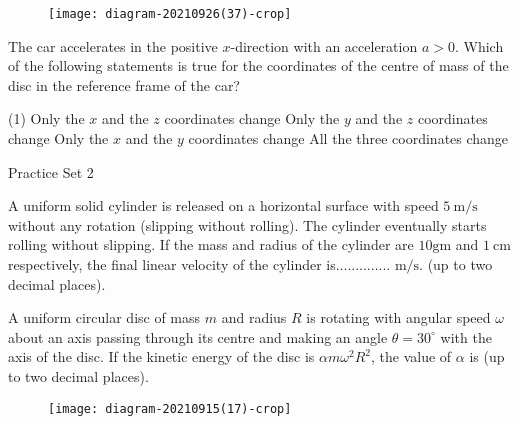 \begin{enumerate}
\begin{minipage}{\textwidth}
	\begin{figure}[H]
		\centering
		\texttt{[image: diagram-20210926(37)-crop]}
	\end{figure}
	The car accelerates in the positive $x$-direction with an acceleration $a>0 .$ Which of the following statements is true for the coordinates of the centre of mass of the disc in the reference frame of the car?
\end{minipage}
\begin{tasks}(1)
	\task[\textbf{A.}]Only the $x$ and the $z$ coordinates change
	\task[\textbf{B.}]Only the $y$ and the $z$ coordinates change
	\task[\textbf{C.}]Only the $x$ and the $y$ coordinates change
	\task[\textbf{D.}]All the three coordinates change
\end{tasks}
\end{enumerate}


\newpage
\begin{abox}
	Practice Set 2
	\end{abox}
\begin{enumerate}
\begin{minipage}{\textwidth}
	\item A uniform solid cylinder is released on a horizontal surface with speed $5 \mathrm{~m} / \mathrm{s}$ without any rotation (slipping without rolling). The cylinder eventually starts rolling without slipping. If the mass and radius of the cylinder are $10 \mathrm{gm}$ and $1 \mathrm{~cm}$ respectively, the final linear velocity of the cylinder is.............. $\mathrm{m} / \mathrm{s}$. (up to two decimal places).
\end{minipage}
\begin{minipage}{\textwidth}
	\item A uniform circular disc of mass $m$ and radius $R$ is rotating with angular speed $\omega$ about an axis passing through its centre and making an angle $\theta=30^{\circ}$ with the axis of the disc. If the kinetic energy of the disc is $\alpha m \omega^{2} R^{2}$, the value of $\alpha$ is (up to two decimal places).
	\begin{figure}[H]
		\centering
		\texttt{[image: diagram-20210915(17)-crop]}
	\end{figure}
\end{minipage}
\end{enumerate}


